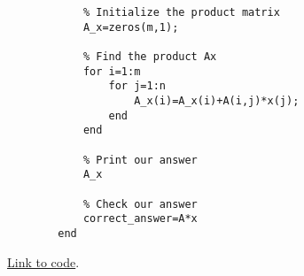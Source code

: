 \documentclass{ximera}
\begin{document}
\begin{example}
\begin{explanation}
\begin{verbatim}
            % Initialize the product matrix
            A_x=zeros(m,1);

            % Find the product Ax 
            for i=1:m
                for j=1:n
                    A_x(i)=A_x(i)+A(i,j)*x(j);
                end
            end

            % Print our answer
            A_x

            % Check our answer
            correct_answer=A*x
        end
    \end{verbatim}

    \href{https://sagecell.sagemath.org/?z=eJxlUU1r20AQvQv0H4aAQU6lYNluY2L2IFoChRx6yckEo0hjexztrtldxSKH_vbOaq0oaXTRzLyPGT1N4NGiyWrckcIaZOkMdVDEUSE2S8hy-AH5DLL5Oo4WkOewgmwBS-6y7zCHfMl4lvfg3CMzuH3iLo4mn31fsXLaQBdHndiwG1vAag1cLAb-Paka3AHB0huC3n24ZSNT9ST8PCmma5iABLI9V7XyGY1nG322KZTsob6ClW5aqawvi_-2Naj27uCR8cYHEaZJN-2Pox2b_hXwEEfAz7k0itQ-ufpFEpUlfXHut3dQGgRSlZan0pXPDd5ceRdsLAb5BNjPr65HudeMihRORlfIuZ2Jb_Nc2TaOTg1VpWOBPypY_VbkqGx8ZJ7Gurqt3CW7QCq2nXhDo20i0zx8UNC-ZzCoig4CtuMcSOR3MrTD6MgjNY4u5glNRXh9KxJKj9PrLjn6PQMHVR2avhi2_zGkHOjWcGz2jOb92JHy84DVyxdKpY3hX7UNM1Fcs4Kd_wE4wcc1&lang=octave&interacts=eJyLjgUAARUAuQ==}{Link to code}.

    \end{explanation}   
    \end{example}
\end{document}
